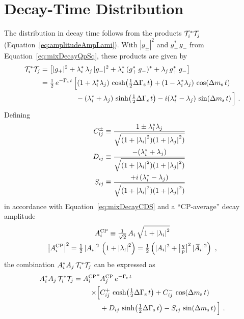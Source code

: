 \section{Decay-Time Distribution}
\label{sec:pheno_time}

The distribution in decay time follows from the products $\timeAmp^*\timeAmp[j]$ (Equation~\ref{eq:amplitudeAmpLami}). With $|g_\pm|^2$ and
$g_+^*\,g_-$ from Equation~\ref{eq:mixDecayQpSq}, these products are given by
\begin{align}
  \timeAmp^*\timeAmp[j]
  &=\left[ |g_+|^2 + \lamf[i]^*\,\lamf[j]\, |g_-|^2 + \lamf[i]^*\, (g_+^*\,g_-)^* + \lamf[j]\, g_+^*\,g_- \right]
      \nonumber \\
  &=\tfrac{1}{2}\, \eGst\, \Big[    (1+\lamf[i]^*\lamf[j]) \, \cDGs
                                +   (1-\lamf[i]^*\lamf[j]) \, \cDms \\
  &\qquad\qquad\quad            -   (\lamf[i]^* + \lamf[j])\,   \sDGs
                                - i (\lamf[i]^* - \lamf[j])\,   \sDms \Big] \ . \nonumber
\end{align}
Defining
\begin{equation}
  \label{eq:CDSPolarDep}
  \begin{aligned}
    \Cf[ij]^\pm    &\equiv \frac{1\pm\lamf[i]^*\lamf[j]}{\sqrt{(1+\lamfSq[i])(1+\lamfSq[j])}} \\
    \qquad \Df[ij] &\equiv \frac{-    (\lamf[i]^* + \lamf[j])}{\sqrt{(1+\lamfSq[i])(1+\lamfSq[j])}} \\
    \qquad \Sf[ij] &\equiv \frac{+i\, (\lamf[i]^* - \lamf[j])}{\sqrt{(1+\lamfSq[i])(1+\lamfSq[j])}}
  \end{aligned}
\end{equation}
in accordance with Equation~\ref{eq:mixDecayCDS} and a ``CP-average'' decay amplitude
\begin{equation}
  \label{eq:CPAvAmp}
  \begin{gathered}
    \magAv \equiv \tfrac{1}{\sqrt{2}}\, \Ai\, \sqrt{1+\lamfSq[i]} \\
    \left|\magAv\right|^2
      = \tfrac{1}{2}\, |\Ai|^2\, \left(1 + \lamfSq\right)
      = \tfrac{1}{2} \left(|\Ai|^2 + \qpAbsAlt^2\,|\Abari|^2\right) \ ,
  \end{gathered}
\end{equation}
the combination $\Ai^*\Ai[j]\,\timeAmp^*\timeAmp[j]$ can be expressed as
\begin{equation}
  \label{eq:timeDep}
  \begin{aligned}
    \Ai^*\Ai[j]\,\timeAmp^*\timeAmp[j]
      = \magAvConj&\magAv[{\Ai[j]}]\, \eGst \\
        \times\Big[ &\Cf[ij]^+\,\cDGs + \Cf[ij]^-\,\cDms \\
                    &+ \Df[ij]\,\sDGs - \Sf[ij]\,\sDms \Big] \ .
  \end{aligned}
\end{equation}

